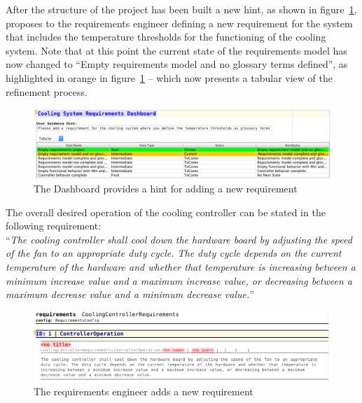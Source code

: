 
After the structure of the project has been built a new hint, as shown in
figure~\ref{fig:dashboard_newreq}, proposes to
the requirements engineer defining a new requirement for the system that
includes the temperature thresholds for the functioning of the cooling system.
Note that at this point the current state of the requirements model has now
changed to ``Empty requirements model and no glossary terms defined'', as
highlighted in orange in figure~\ref{fig:dashboard_newreq} -- which now presents
a tabular view of the refinement process.
\vspace{-0cm}
\begin{figure}[!h]
\centering 
\includegraphics[width=.8\textwidth]{./figures/DefineCoolingReq.png}
\caption{The Dashboard provides a hint for adding a new requirement}
\label{fig:dashboard_newreq}
\vspace{-.3cm}
\end{figure}

The overall desired operation of the cooling controller can be stated in the
following requirement:\\

``\emph{The cooling controller shall cool down the hardware board by adjusting
the speed of the fan to an appropriate duty cycle. The duty cycle depends on the
current temperature of the hardware and whether that temperature is increasing
between a minimum increase value and a maximum increase value, or decreasing
between a maximum decrease value and a minimum decrease value.}''\\
 \vspace{-.6cm}
\begin{figure}[!h]
\centering 
\includegraphics[width=1\textwidth]{./figures/textReqIncomplete.png}
\caption{The requirements engineer adds a new requirement}
\label{fig:new_req}
\vspace{-.6cm}
\end{figure}

